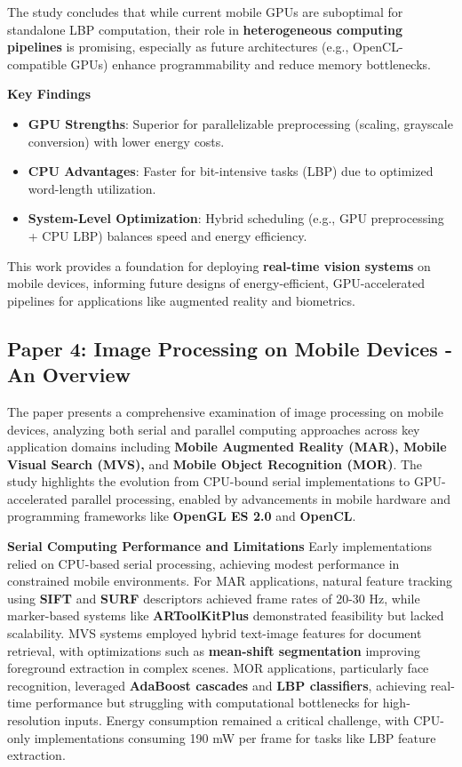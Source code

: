 \documentclass[conference]{IEEEtran}
\begin{document}
The study concludes that while current mobile GPUs are suboptimal for standalone LBP computation, their role in \textbf{heterogeneous computing pipelines} is promising, especially as future architectures (e.g., OpenCL-compatible GPUs) enhance programmability and reduce memory bottlenecks.

\textbf{Key Findings}  
\begin{itemize}
    \item \textbf{GPU Strengths}: Superior for parallelizable preprocessing (scaling, grayscale conversion) with lower energy costs.
    \item \textbf{CPU Advantages}: Faster for bit-intensive tasks (LBP) due to optimized word-length utilization.
    \item \textbf{System-Level Optimization}: Hybrid scheduling (e.g., GPU preprocessing + CPU LBP) balances speed and energy efficiency.
\end{itemize}

This work provides a foundation for deploying \textbf{real-time vision systems} on mobile devices, informing future designs of energy-efficient, GPU-accelerated pipelines for applications like augmented reality and biometrics.

\subsection{Paper 4: Image Processing on Mobile Devices - An Overview}

The paper presents a comprehensive examination of image processing on mobile devices, analyzing both serial and parallel computing approaches across key application domains including \textbf{Mobile Augmented Reality (MAR), Mobile Visual Search (MVS),} and \textbf{Mobile Object Recognition (MOR)}. The study highlights the evolution from CPU-bound serial implementations to GPU-accelerated parallel processing, enabled by advancements in mobile hardware and programming frameworks like \textbf{OpenGL ES 2.0} and \textbf{OpenCL}.

\textbf{Serial Computing Performance and Limitations}  
Early implementations relied on CPU-based serial processing, achieving modest performance in constrained mobile environments. For MAR applications, natural feature tracking using \textbf{SIFT} and \textbf{SURF} descriptors achieved frame rates of 20-30 Hz, while marker-based systems like \textbf{ARToolKitPlus} demonstrated feasibility but lacked scalability. MVS systems employed hybrid text-image features for document retrieval, with optimizations such as \textbf{mean-shift segmentation} improving foreground extraction in complex scenes. MOR applications, particularly face recognition, leveraged \textbf{AdaBoost cascades} and \textbf{LBP classifiers}, achieving real-time performance but struggling with computational bottlenecks for high-resolution inputs. Energy consumption remained a critical challenge, with CPU-only implementations consuming 190 mW per frame for tasks like LBP feature extraction.
\end{document}
